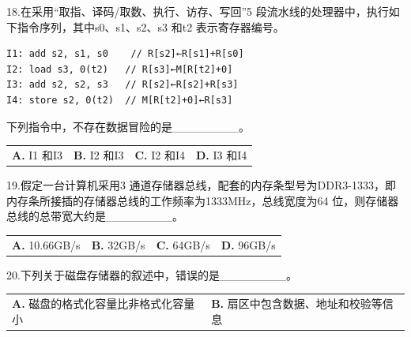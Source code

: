 \documentclass[UTF8,11pt]{ctexart}
\begin{document}
18.在采用“取指、译码/取数、执行、访存、写回”5 段流水线的处理器中，执行如下指令序列，其中s0、s1、s2、s3 和t2 表示寄存器编号。


\begin{Verbatim}[breaklines,breakanywhere,fontsize=\small]
I1: add s2, s1, s0    // R[s2]←R[s1]+R[s0]
I2: load s3, 0(t2)   // R[s3]←M[R[t2]+0]
I3: add s2, s2, s3   // R[s2]←R[s2]+R[s3]
I4: store s2, 0(t2)  // M[R[t2]+0]←R[s3]
\end{Verbatim}

下列指令中，不存在数据冒险的是\_\_\_\_\_\_\_\_。


\begin{center}\begin{tabular}{>{\raggedright\arraybackslash}p{\dimexpr(\linewidth-8\tabcolsep)/4\relax}>{\raggedright\arraybackslash}p{\dimexpr(\linewidth-8\tabcolsep)/4\relax}>{\raggedright\arraybackslash}p{\dimexpr(\linewidth-8\tabcolsep)/4\relax}>{\raggedright\arraybackslash}p{\dimexpr(\linewidth-8\tabcolsep)/4\relax}}
\textbf{A.} I1 和I3 & \textbf{B.} I2 和I3 & \textbf{C.} I2 和I4 & \textbf{D.} I3 和I4\\[.35em]\end{tabular}\end{center}

19.假定一台计算机采用3 通道存储器总线，配套的内存条型号为DDR3-1333，即内存条所接插的存储器总线的工作频率为1333MHz，总线宽度为64 位，则存储器总线的总带宽大约是\_\_\_\_\_\_\_\_。


\begin{center}\begin{tabular}{>{\raggedright\arraybackslash}p{\dimexpr(\linewidth-8\tabcolsep)/4\relax}>{\raggedright\arraybackslash}p{\dimexpr(\linewidth-8\tabcolsep)/4\relax}>{\raggedright\arraybackslash}p{\dimexpr(\linewidth-8\tabcolsep)/4\relax}>{\raggedright\arraybackslash}p{\dimexpr(\linewidth-8\tabcolsep)/4\relax}}
\textbf{A.} 10.\allowbreak{}66GB/s & \textbf{B.} 32GB/s & \textbf{C.} 64GB/s & \textbf{D.} 96GB/s\\[.35em]\end{tabular}\end{center}

20.下列关于磁盘存储器的叙述中，错误的是\_\_\_\_\_\_\_\_。


\begin{center}\begin{tabular}{>{\raggedright\arraybackslash}p{\dimexpr(\linewidth-4\tabcolsep)/2\relax}>{\raggedright\arraybackslash}p{\dimexpr(\linewidth-4\tabcolsep)/2\relax}}
\textbf{A.} 磁盘的格式化容量比非格式化容量小 & \textbf{B.} 扇区中包含数据、地址和校验等信息\\[.35em]\end{tabular}\end{center}
\end{document}
